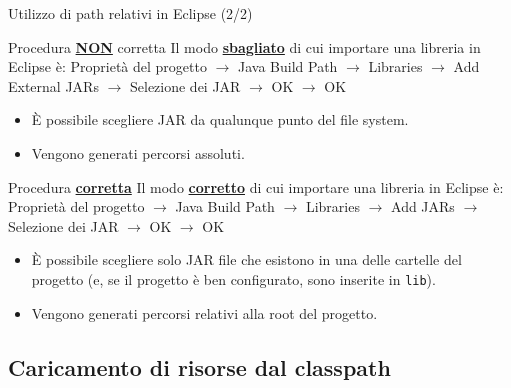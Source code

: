 \documentclass[presentation]{beamer}
\begin{document}
\begin{frame}{Utilizzo di path relativi in Eclipse (2/2)}

\begin{block}{Procedura \textbf{\underline{NON}} corretta}
Il modo \textbf{\underline{sbagliato}} di cui importare una libreria in Eclipse è: Proprietà del progetto $\rightarrow$ Java Build Path $\rightarrow$ Libraries $\rightarrow$ Add External JARs $\rightarrow$ Selezione dei JAR $\rightarrow$ OK $\rightarrow$ OK
\begin{itemize}
\item \`{E} possibile scegliere JAR da qualunque punto del file system.
\item Vengono generati percorsi assoluti.
\end{itemize}
\end{block}

\begin{block}{Procedura \textbf{\underline{corretta}}}
Il modo \textbf{\underline{corretto}} di cui importare una libreria in Eclipse è: Proprietà del progetto $\rightarrow$ Java Build Path $\rightarrow$ Libraries $\rightarrow$ Add JARs $\rightarrow$ Selezione dei JAR $\rightarrow$ OK $\rightarrow$ OK
\begin{itemize}
\item \`{E} possibile scegliere solo JAR file che esistono in una delle cartelle del progetto (e, se il progetto è ben configurato, sono inserite in \texttt{lib}).
\item Vengono generati percorsi relativi alla root del progetto.
\end{itemize}
\end{block}
\end{frame}

\subsection{Caricamento di risorse dal classpath}
\end{document}
